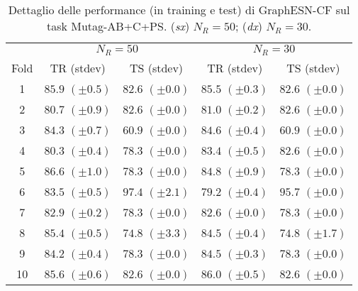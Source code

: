 \begin{table}[tbph]
\footnotesize
\caption[Dettaglio performance: GraphESN-CF su Mutag-AB+C+PS]{Dettaglio delle performance (in training e test) di GraphESN-CF sul task Mutag-AB+C+PS. (\emph{sx}) $N_R=50$; (\emph{dx}) $N_R=30$.}
\label{app:esp:Mutag-ABCPC-CF}
\centering
\begin{tabular}{c*{4}{c}}
\toprule
& \multicolumn{2}{c}{$N_R=50$} & \multicolumn{2}{c}{$N_R=30$}\\
Fold & TR (stdev) & TS (stdev) & TR (stdev) & TS (stdev)\\
\midrule
1 & $85.9$ $(\pm 0.5)$ & $82.6$ $(\pm 0.0)$ & $85.5$ $(\pm 0.3)$ & $82.6$ $(\pm 0.0)$\\
2 & $80.7$ $(\pm 0.9)$ & $82.6$ $(\pm 0.0)$ & $81.0$ $(\pm 0.2)$ & $82.6$ $(\pm 0.0)$\\
3 & $84.3$ $(\pm 0.7)$ & $60.9$ $(\pm 0.0)$ & $84.6$ $(\pm 0.4)$ & $60.9$ $(\pm 0.0)$\\
4 & $80.3$ $(\pm 0.4)$ & $78.3$ $(\pm 0.0)$ & $83.4$ $(\pm 0.5)$ & $82.6$ $(\pm 0.0)$\\
5 & $86.6$ $(\pm 1.0)$ & $78.3$ $(\pm 0.0)$ & $84.8$ $(\pm 0.9)$ & $78.3$ $(\pm 0.0)$\\
6 & $83.5$ $(\pm 0.5)$ & $97.4$ $(\pm 2.1)$ & $79.2$ $(\pm 0.4)$ & $95.7$ $(\pm 0.0)$\\
7 & $82.9$ $(\pm 0.2)$ & $78.3$ $(\pm 0.0)$ & $82.6$ $(\pm 0.0)$ & $78.3$ $(\pm 0.0)$\\
8 & $85.4$ $(\pm 0.5)$ & $74.8$ $(\pm 3.3)$ & $84.5$ $(\pm 0.4)$ & $74.8$ $(\pm 1.7)$\\
9 & $84.2$ $(\pm 0.4)$ & $78.3$ $(\pm 0.0)$ & $84.5$ $(\pm 0.3)$ & $78.3$ $(\pm 0.0)$\\
10 & $85.6$ $(\pm 0.6)$ & $82.6$ $(\pm 0.0)$ & $86.0$ $(\pm 0.5)$ & $82.6$ $(\pm 0.0)$\\
\bottomrule
\end{tabular}
\end{table}



